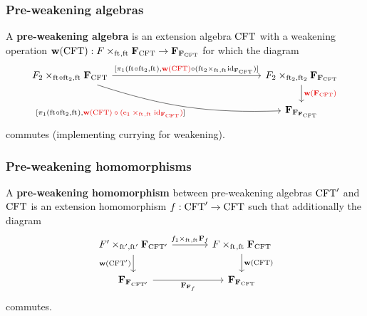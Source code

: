 \documentclass{beamer}
\newcommand\important[1]{\textbf{\color{red!90!black}#1}}
\begin{document}
\begin{frame}
\frametitle{\bf Pre-weakening algebras}
A \important{pre-weakening algebra} is an extension algebra $\mathrm{CFT}$ 
with a weakening operation 
$ \mathbf{w}(\stesys)
    :
  \cobesys{\stesysf}{\famesys{\stesys}}{\eft}{\eft}
    \to
  \famesys{\famesys{\stesys}}$
for which the diagram
\begin{equation*}
\begin{tikzcd}[ampersand replacement=\&,column sep=15em]
\cobesys{\stesysf_2}{\famesys{\stesys}}{\eft\circ\eft[2]}{\eft}
  \ar[bend right=10]{dr}[swap]%
    { [ \pullbackpr{1}{\eft\circ\eft[2]}{\eft},%
        \important{$
        \mathbf{w}(\stesys)%
          \circ%
        (\pullback{\efamext}{\catid{\famesys{\stesys}}}{\eft}{\eft})$}%
        ]%
      }
  \ar{r}{
    [ \pullbackpr{1}{\eft\circ\eft[2]}{\eft},%
      \important{$\mathbf{w}(\stesys)$}%
        \circ%
      (\pullback{\eft[2]}{\catid{\famesys{\stesys}}}{\eft}{\eft})%
      ]}%
  \&
\cobesys{\stesysf_2}{\famesys{\famesys{\stesys}}}{\eft[2]}{\eft[2]}
  \ar{d}{\important{$\mathbf{w}(\famesys{\stesys})$}}
  \\
  {}\&
\famesys{\famesys{\famesys{\stesys}}}
\end{tikzcd}
\end{equation*}
commutes (implementing currying for weakening).
\end{frame}

\begin{frame}
\frametitle{\bf Pre-weakening homomorphisms}
A \important{pre-weakening homomorphism} between pre-weakening algebras $\mathrm{CFT}'$ and $\mathrm{CFT}$ is an
extension homomorphism $f:\mathrm{CFT}'\to \mathrm{CFT}$ such that additionally the diagram
\begin{equation*}
\begin{tikzcd}[ampersand replacement=\&,column sep=large]
\cobesys{\stesysf'}{\famesys{\stesys'}}{\eft'}{\eft'}
  \ar{d}[swap]{\mathbf{w}(\stesys')}
  \ar{r}{\pullback{f_1}{\famehom{f}}{\eft}{\eft}}
  \&
\cobesys{\stesysf}{\famesys{\stesys}}{\eft}{\eft}
  \ar{d}{\mathbf{w}(\stesys)}
  \\
\famesys{\famesys{\stesys'}}
  \ar{r}[swap]{\famehom{\famehom{f}}}
  \&
\famesys{\famesys{\stesys}}
\end{tikzcd}
\end{equation*}
commutes.
\end{frame}
\end{document}
